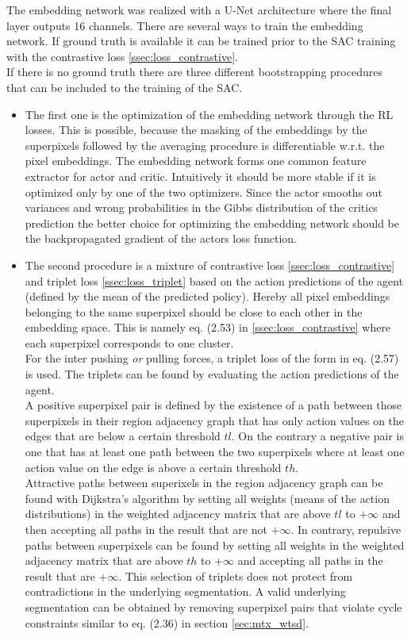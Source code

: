The embedding network was realized with a U-Net architecture \cite{ronneberger2015unet} where the final layer outputs 16 channels. There are several ways to train the embedding network. If ground truth is available it can be trained prior to the SAC training with the contrastive loss \ref{ssec:loss_contrastive}.\\
If there is no ground truth there are three different bootstrapping procedures that can be included to the training of the SAC.\\
\begin{itemize}
 	\item The first one is the optimization of the embedding network through the RL losses. This is possible, because the masking of the embeddings by the superpixels followed by the averaging procedure is differentiable w.r.t. the pixel embeddings. The embedding network forms one common feature extractor for actor and critic. Intuitively it should be more stable if it is optimized only by one of the two optimizers. Since the actor smooths out variances and wrong probabilities in the Gibbs distribution of the critics prediction the better choice for optimizing the embedding network should be the backpropagated gradient of the actors loss function.
 	\item The second procedure is a mixture of contrastive loss \ref{ssec:loss_contrastive} and triplet loss \ref{ssec:loss_triplet} based on the action predictions of the agent (defined by the mean of the predicted policy). Hereby all pixel embeddings belonging to the same superpixel should be close to each other in the embedding space. This is namely eq. (2.53) in \ref{ssec:loss_contrastive} where each superpixel corresponds to one cluster.\\
 	For the inter pushing \emph{or} pulling forces, a triplet loss of the form in eq. (2.57) is used. The triplets can be found by evaluating the action predictions of the agent.\\
 	A positive superpixel pair is defined by the existence of a path between those superpixels in their region adjacency graph that has only action values on the edges that are below a certain threshold $tl$. On the contrary a negative pair is one that has at least one path between the two superpixels where at least one action value on the edge is above a certain threshold $th$.\\
 	Attractive paths between superixels in the region adjacency graph can be found with Dijkstra's algorithm by setting all weights (means of the action distributions) in the weighted adjacency matrix that are above $tl$ to $+\infty$ and then accepting all paths in the result that are not $+\infty$. In contrary, repulsive paths between superpixels can be found by setting all weights in the weighted adjacency matrix that are above $th$ to $+\infty$ and accepting all paths in the result that are $+\infty$. This selection of triplets does not protect from contradictions in the underlying segmentation. A valid underlying segmentation can be obtained by removing superpixel pairs that violate cycle constraints similar to eq. (2.36) in section \ref{sec:mtx_wtsd}.

\end{itemize}

